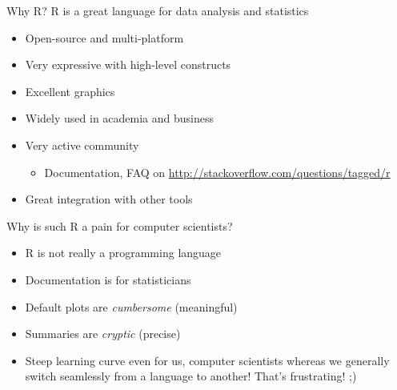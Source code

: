 \documentclass[11pt,xcolor=dvipsnames]{beamer}
\begin{document}
\begin{frame}[label=sec-4-1-1]{Why R?}
R is a great language for data analysis and statistics
\begin{itemize}
\item Open-source and multi-platform
\item Very expressive with high-level constructs
\item Excellent graphics
\item Widely used in academia and business
\item Very active community
\begin{itemize}
\item Documentation, FAQ on \url{http://stackoverflow.com/questions/tagged/r}
\end{itemize}
\item Great integration with other tools
\end{itemize}
\end{frame}
\begin{frame}[label=sec-4-1-2]{Why is such R a pain for computer scientists?}
\begin{itemize}
\item R is \alert{not} really a \alert{programming} language
\item Documentation is for statisticians
\item Default plots are \textit{cumbersome} (meaningful)
\item Summaries are \textit{cryptic} (precise)
\item \alert{Steep learning curve} even for us, computer scientists whereas we
generally switch seamlessly from a language to another!  That's
frustrating! ;)
\end{itemize}
\end{frame}
\end{document}
